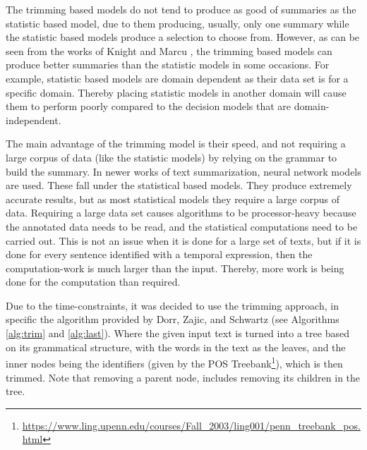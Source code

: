 \par The trimming based models do not tend to produce as good of summaries as the statistic based model, due to them producing, usually, only one summary while the statistic based models produce a selection to choose from. However, as can be seen from the works of Knight and Marcu \cite{knightmarcu2000}, the trimming based models can produce better summaries than the statistic models in some occasions. For example, statistic based models are domain dependent as their data set is for a specific domain. Thereby placing statistic models in another domain will cause them to perform poorly compared to the decision models that are domain-independent. 
\par The main advantage of the trimming model is their speed, and not requiring a large corpus of data (like the statistic models) by relying on the grammar to build the summary. In newer works of text summarization, neural network models are used. These fall under the statistical based models. They produce extremely accurate results, but as most statistical models they require a large corpus of data. Requiring a large data set causes algorithms to be processor-heavy because the annotated data needs to be read, and the statistical computations need to be carried out. This is not an issue when it is done for a large set of texts, but if it is done for every sentence identified with a temporal expression, then the computation-work is much larger than the input. Thereby, more work is being done for the computation than required.
\par Due to the time-constraints, it was decided to use the trimming approach, in specific the algorithm provided by Dorr, Zajic, and Schwartz \cite{dorrzajicschwartz2003} (see Algorithms \ref{alg:trim} and \ref{alg:last}). Where the given input text is turned into a tree based on its grammatical structure, with the words in the text as the leaves, and the inner nodes being the identifiers (given by the POS Treebank\footnote{\url{https://www.ling.upenn.edu/courses/Fall_2003/ling001/penn_treebank_pos.html}}), which is then trimmed. Note that removing a parent node, includes removing its children in the tree. \par

